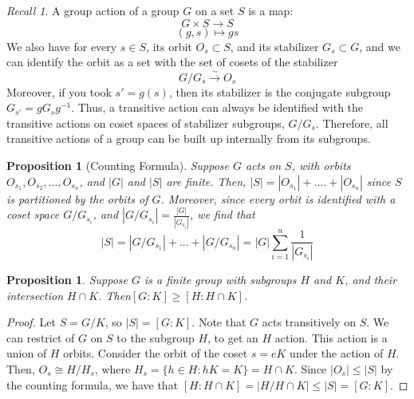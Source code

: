 \documentclass[12pt]{article}
\newtheorem{prop}[thm]{Proposition}
\theoremstyle{definition}
\theoremstyle{remark}
\newtheorem*{rec}{Recall}
\numberwithin{equation}{section}
\begin{document}
\begin{rec}
        A group action of a group $G$ on a set $S$ is a map:\begin{equation}
                G\times S \rightarrow S
        \end{equation}
        \begin{equation}
                (g,s)\mapsto gs
        \end{equation}
        We also have for every $s \in S$, its orbit $O_s \subset S$, and its stabilizer $G_s \subset G$, and we can identify the orbit as a set with the set of cosets of the stabilizer \begin{equation}
                G/G_s \xrightarrow{\sim} O_s
        \end{equation}
        Moreover, if you took $s' = g(s)$, then its stabilizer is the conjugate subgroup $G_{s'} = gG_sg^{-1}$. Thus, a transitive action can always be identified with the transitive actions on coset spaces of stabilizer subgroups, $G/G_s$. Therefore, all transitive actions of a group can be built up internally from its subgroups. 
\end{rec}

\vspace{15pt}

\begin{prop}[Counting Formula]
        Suppose $G$ acts on $S$, with orbits $O_{s_1},O_{s_2},...,O_{s_n}$, and $|G|$ and $|S|$ are finite. Then, $|S| = |O_{s_1}| + .... + |O_{s_n}|$ since $S$ is partitioned by the orbits of $G$. Moreover, since every orbit is identified with a coset space $G/G_{s_i}$, and $|G/G_{s_i}| = \frac{|G|}{|G_{s_i}|}$, we find that \begin{equation}
                |S| = |G/G_{s_1}| + ... + |G/G_{s_n}| = |G|\sum\limits_{i=1}^n\frac{1}{|G_{s_i}|}
        \end{equation}
\end{prop}


\vspace{15pt}

\begin{prop}
        Suppose $G$ is a finite group with subgroups $H$ and $K$, and their intersection $H \cap K$. Then$[G:K] \geq [H:H\cap K]$.
\end{prop}
\begin{proof}
        Let $S = G/K$, so $|S| = [G:K]$. Note that $G$ acts transitively on $S$. We can restrict of $G$ on $S$ to the subgroup $H$, to get an $H$ action. This action is a union of $H$ orbits. Consider the orbit of the coset $s= eK$ under the action of $H$. Then, $O_s \cong H/H_s$, where $H_s = \{h\in H: hK = K\} = H\cap K$. Since $|O_s| \leq |S|$ by the counting formula, we have that $[H:H\cap K] = |H/H\cap K| \leq |S| = [G:K]$.
\end{proof}
\end{document}
